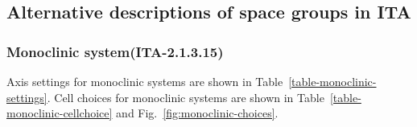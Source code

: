 
\subsection{Alternative descriptions of space groups in ITA}

\subsubsection{Monoclinic system(ITA-2.1.3.15)}


Axis settings for monoclinic systems are shown in Table~\ref{table-monoclinic-settings}.
Cell choices for monoclinic systems are shown in Table~\ref{table-monoclinic-cellchoice} and Fig.~\ref{fig:monoclinic-choices}.

